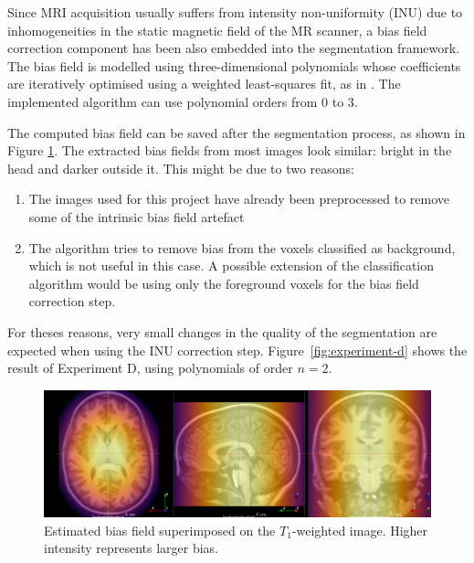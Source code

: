 
Since MRI acquisition usually suffers from intensity non-uniformity (INU) due to inhomogeneities in the static magnetic field of the MR scanner, a bias field correction component has been also embedded into the segmentation framework. The bias field is modelled using three-dimensional polynomials whose coefficients are iteratively optimised using a weighted least-squares fit, as in \cite{leemput_automated_1999}. The implemented algorithm can use polynomial orders from 0 to 3.

The computed bias field can be saved after the segmentation process, as shown in Figure \ref{fig:bias-field}. The extracted bias fields from most images look similar: bright in the head and darker outside it. This might be due to two reasons:
\begin{enumerate}
  \item The images used for this project have already been preprocessed to remove some of the intrinsic bias field artefact
  \item The algorithm tries to remove bias from the voxels classified as background, which is not useful in this case. A possible extension of the classification algorithm would be using only the foreground voxels for the bias field correction step.
\end{enumerate}
For theses reasons, very small changes in the quality of the segmentation are expected when using the INU correction step. Figure~\ref{fig:experiment-d} shows the result of Experiment D, using polynomials of order $n = 2$.

\begin{figure}
  \centering
  \includegraphics[width=\textwidth]{figures/bias_field}
  \caption{Estimated bias field superimposed on the $T_1$-weighted image. Higher intensity represents larger bias.}
  \label{fig:bias-field}
\end{figure}


